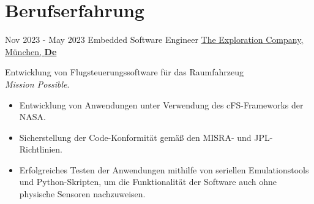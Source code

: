 \documentclass[letterpaper]{twentysecondcv} %
\begin{document}
\makeprofile %

%
%
\section{Berufserfahrung}

\begin{twenty} %

    \twentyitem
        {Nov 2023 -}
        {May 2023}
        {Embedded Software Engineer}
        {\href{https://www.exploration.space/}{The Exploration Company, München, \textbf{De}}}
        {}
        {
            Entwicklung von Flugsteuerungssoftware für das Raumfahrzeug \\\textit{Mission Possible}.
            \vspace{1 mm}
            \begin{itemize}
                \item Entwicklung von Anwendungen unter Verwendung des cFS-Frameworks der NASA.
                \item Sicherstellung der Code-Konformität gemäß den MISRA- und JPL-Richtlinien.
                \item Erfolgreiches Testen der Anwendungen mithilfe von seriellen Emulationstools und Python-Skripten, um die Funktionalität der Software auch ohne physische Sensoren nachzuweisen.
            \end{itemize}

}
\end{twenty}
\end{document}
